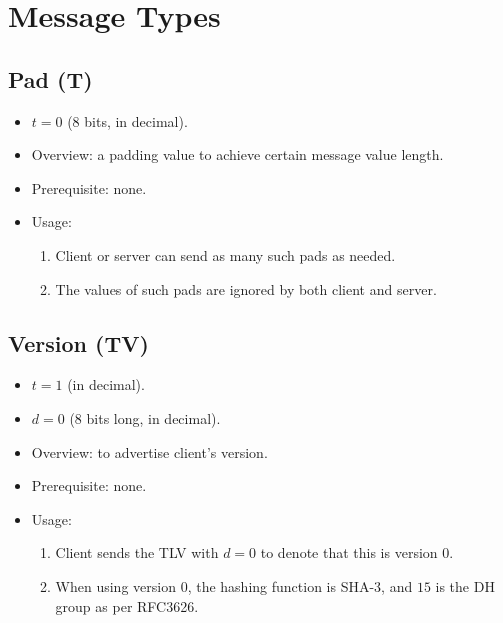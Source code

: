 \documentclass{article}
\begin{document}
\section{Message Types}
\subsection{Pad (T)}
\begin{itemize}
    \item $t = 0$ (8 bits, in decimal).
    \item Overview: a padding value to achieve certain message value length. 
    \item Prerequisite: none.
    \item Usage:
        \begin{enumerate}
            \item Client or server can send as many such pads as needed.
            \item The values of such pads are ignored by both client and
            server.
        \end{enumerate}
\end{itemize}

\subsection{Version (TV)}
\begin{itemize}
    \item $t = 1$ (in decimal).
    \item $d = 0$ (8 bits long, in decimal).
    \item Overview: to advertise client's version. 
    \item Prerequisite: none.
    \item Usage:
        \begin{enumerate}
            \item Client sends the TLV with $d=0$ to denote that this is
            version 0.
            \item When using version $0$, the hashing function is SHA-3, and
            $15$ is the DH group as per RFC3626.
        \end{enumerate}
\end{itemize}
\end{document}
